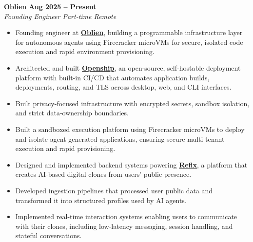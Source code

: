 \documentclass[letterpaper, 11pt]{article}
\begin{document}
\textbf{Oblien} \hfill \textbf{Aug 2025 -- Present} \\
\textit{Founding Engineer \textbar{} Part-time Remote}
\begin{itemize}[leftmargin=1.5em, nosep, itemsep=0.15em]
 \item Founding engineer at \href{https://oblien.com/}{\textbf{Oblien}}, building a programmable infrastructure layer for autonomous agents using Firecracker microVMs for secure, isolated code execution and rapid environment provisioning.
  \item Architected and built \href{https://openship.io/}{\textbf{Openship}}, an open-source, self-hostable deployment platform with built-in CI/CD that automates application builds, deployments, routing, and TLS across desktop, web, and CLI interfaces.
  \item Built privacy-focused infrastructure with encrypted secrets, sandbox isolation, and strict data-ownership boundaries.
  \item Built a sandboxed execution platform using Firecracker microVMs to deploy and isolate agent-generated applications, ensuring secure multi-tenant execution and rapid provisioning.
  
    \item Designed and implemented backend systems powering \href{https://reflx.me/}{\textbf{Reflx}}, a platform that creates AI-based digital clones from users' public presence.

  \item Developed ingestion pipelines that processed user public data and transformed it into structured profiles used by AI agents.

  \item Implemented real-time interaction systems enabling users to communicate with their clones, including low-latency messaging, session handling, and stateful conversations.

\end{itemize}
\end{document}
